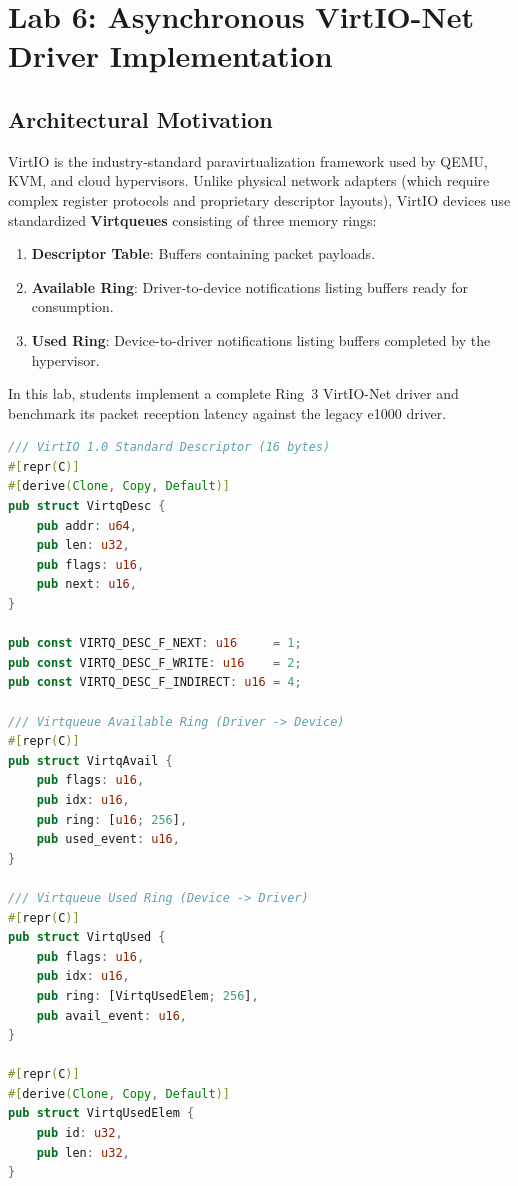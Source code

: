 \section{Lab 6: Asynchronous VirtIO-Net Driver Implementation}
\label{sec:lab6}

\subsection{Architectural Motivation}

VirtIO is the industry-standard paravirtualization framework used by QEMU, KVM, and cloud hypervisors. Unlike physical network adapters (which require complex register protocols and proprietary descriptor layouts), VirtIO devices use standardized \textbf{Virtqueues} consisting of three memory rings:
\begin{enumerate}
    \item \textbf{Descriptor Table}: Buffers containing packet payloads.
    \item \textbf{Available Ring}: Driver-to-device notifications listing buffers ready for consumption.
    \item \textbf{Used Ring}: Device-to-driver notifications listing buffers completed by the hypervisor.
\end{enumerate}

In this lab, students implement a complete Ring~3 VirtIO-Net driver and benchmark its packet reception latency against the legacy e1000 driver.

\begin{lstlisting}[language=Rust, caption={Virtqueue Memory Structures (\texttt{src/net/virtio.rs})}]
/// VirtIO 1.0 Standard Descriptor (16 bytes)
#[repr(C)]
#[derive(Clone, Copy, Default)]
pub struct VirtqDesc {
    pub addr: u64,
    pub len: u32,
    pub flags: u16,
    pub next: u16,
}

pub const VIRTQ_DESC_F_NEXT: u16     = 1;
pub const VIRTQ_DESC_F_WRITE: u16    = 2;
pub const VIRTQ_DESC_F_INDIRECT: u16 = 4;

/// Virtqueue Available Ring (Driver -> Device)
#[repr(C)]
pub struct VirtqAvail {
    pub flags: u16,
    pub idx: u16,
    pub ring: [u16; 256],
    pub used_event: u16,
}

/// Virtqueue Used Ring (Device -> Driver)
#[repr(C)]
pub struct VirtqUsed {
    pub flags: u16,
    pub idx: u16,
    pub ring: [VirtqUsedElem; 256],
    pub avail_event: u16,
}

#[repr(C)]
#[derive(Clone, Copy, Default)]
pub struct VirtqUsedElem {
    pub id: u32,
    pub len: u32,
}
\end{lstlisting}

